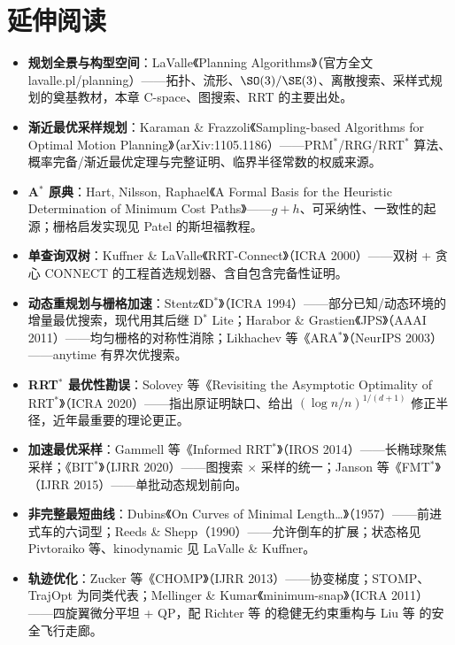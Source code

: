 \section*{延伸阅读}
\begin{itemize}
  \item \textbf{规划全景与构型空间}：LaValle《Planning Algorithms》\cite{lavalle2006planning}（官方全文 lavalle.pl/planning）——拓扑、流形、$\SO(3)/\SE(3)$、离散搜索、采样式规划的奠基教材，本章 C-space、图搜索、RRT 的主要出处。
  \item \textbf{渐近最优采样规划}：Karaman \& Frazzoli《Sampling-based Algorithms for Optimal Motion Planning》\cite{karaman2011sampling}（arXiv:1105.1186）——PRM$^*$/RRG/RRT$^*$ 算法、概率完备/渐近最优定理与完整证明、临界半径常数的权威来源。
  \item \textbf{A$^*$ 原典}：Hart, Nilsson, Raphael《A Formal Basis for the Heuristic Determination of Minimum Cost Paths》\cite{hart1968astar}——$g+h$、可采纳性、一致性的起源；栅格启发实现见 Patel 的斯坦福教程\cite{patel2018heuristics}。
  \item \textbf{单查询双树}：Kuffner \& LaValle《RRT-Connect》\cite{kuffner2000rrtconnect}（ICRA 2000）——双树 + 贪心 CONNECT 的工程首选规划器、含自包含完备性证明。
  \item \textbf{动态重规划与栅格加速}：Stentz《D$^*$》\cite{stentz1994optimal}（ICRA 1994）——部分已知/动态环境的增量最优搜索，现代用其后继 D$^*$ Lite；Harabor \& Grastien《JPS》\cite{harabor2011jps}（AAAI 2011）——均匀栅格的对称性消除；Likhachev 等《ARA$^*$》\cite{likhachev2004ara}（NeurIPS 2003）——anytime 有界次优搜索。
  \item \textbf{RRT$^*$ 最优性勘误}：Solovey 等《Revisiting the Asymptotic Optimality of RRT$^*$》\cite{solovey2020revisiting}（ICRA 2020）——指出原证明缺口、给出 $(\log n/n)^{1/(d+1)}$ 修正半径，近年最重要的理论更正。
  \item \textbf{加速最优采样}：Gammell 等《Informed RRT$^*$》\cite{gammell2014informed}（IROS 2014）——长椭球聚焦采样；《BIT$^*$》\cite{gammell2020bit}（IJRR 2020）——图搜索 $\times$ 采样的统一；Janson 等《FMT$^*$》\cite{janson2015fmt}（IJRR 2015）——单批动态规划前向。
  \item \textbf{非完整最短曲线}：Dubins《On Curves of Minimal Length\dots》\cite{dubins1957curves}（1957）——前进式车的六词型；Reeds \& Shepp\cite{reeds1990optimal}（1990）——允许倒车的扩展；状态格见 Pivtoraiko 等\cite{pivtoraiko2009lattice}、kinodynamic 见 LaValle \& Kuffner\cite{lavalle2001kinodynamic}。
  \item \textbf{轨迹优化}：Zucker 等《CHOMP》\cite{zucker2013chomp}（IJRR 2013）——协变梯度；STOMP\cite{kalakrishnan2011stomp}、TrajOpt\cite{schulman2014trajopt} 为同类代表；Mellinger \& Kumar《minimum-snap》\cite{mellinger2011minimum}（ICRA 2011）——四旋翼微分平坦 + QP，配 Richter 等\cite{richter2016polynomial} 的稳健无约束重构与 Liu 等\cite{liu2017corridor} 的安全飞行走廊。
\end{itemize}

